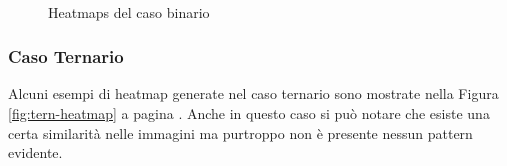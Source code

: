 \begin{figure}[htpb!]
		 \\     %
		\caption{Heatmaps del caso binario}
		\label{fig:bin-heatmap}
	\end{figure}

\subsubsection{Caso Ternario}
Alcuni esempi di heatmap generate nel caso ternario sono mostrate nella Figura \ref{fig:tern-heatmap} a
pagina \pageref{fig:tern-heatmap}.
Anche in questo caso si può notare che esiste una certa similarità nelle immagini ma purtroppo
non è presente nessun pattern evidente.

